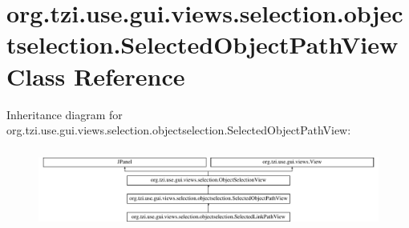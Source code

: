 \hypertarget{classorg_1_1tzi_1_1use_1_1gui_1_1views_1_1selection_1_1objectselection_1_1_selected_object_path_view}{\section{org.\-tzi.\-use.\-gui.\-views.\-selection.\-objectselection.\-Selected\-Object\-Path\-View Class Reference}
\label{classorg_1_1tzi_1_1use_1_1gui_1_1views_1_1selection_1_1objectselection_1_1_selected_object_path_view}
}
Inheritance diagram for org.\-tzi.\-use.\-gui.\-views.\-selection.\-objectselection.\-Selected\-Object\-Path\-View\-:\begin{figure}[H]
\begin{center}
\leavevmode
\includegraphics[height=2.660333cm]{classorg_1_1tzi_1_1use_1_1gui_1_1views_1_1selection_1_1objectselection_1_1_selected_object_path_view}
\end{center}
\end{figure}

